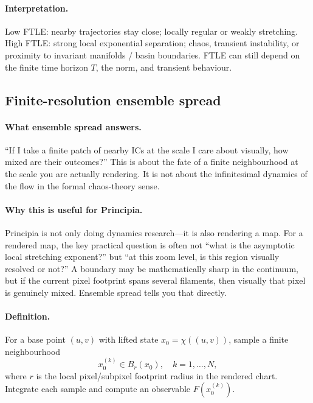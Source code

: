 \documentclass[11pt]{report}
\begin{document}
\paragraph{Interpretation.} Low FTLE: nearby trajectories stay close; locally regular or weakly stretching. High FTLE: strong local exponential separation; chaos, transient instability, or proximity to invariant manifolds / basin boundaries. FTLE can still depend on the finite time horizon $T$, the norm, and transient behaviour.

\subsection{Finite-resolution ensemble spread}
\label{sec:ensemble}

\paragraph{What ensemble spread answers.} ``If I take a finite patch of nearby ICs at the scale I care about visually, how mixed are their outcomes?'' This is about the fate of a finite neighbourhood at the scale you are actually rendering. It is not about the infinitesimal dynamics of the flow in the formal chaos-theory sense.

\paragraph{Why this is useful for Principia.} Principia is not only doing dynamics research---it is also rendering a map. For a rendered map, the key practical question is often not ``what is the asymptotic local stretching exponent?'' but ``at this zoom level, is this region visually resolved or not?'' A boundary may be mathematically sharp in the continuum, but if the current pixel footprint spans several filaments, then visually that pixel is genuinely mixed. Ensemble spread tells you that directly.

\paragraph{Definition.} For a base point $(u,v)$ with lifted state $x_0=\chi((u,v))$, sample a finite neighbourhood
\[
x_0^{(k)}\in B_r(x_0),\quad k=1,\ldots,N,
\]
where $r$ is the local pixel/subpixel footprint radius in the rendered chart. Integrate each sample and compute an observable $F(x_0^{(k)})$.
\end{document}
